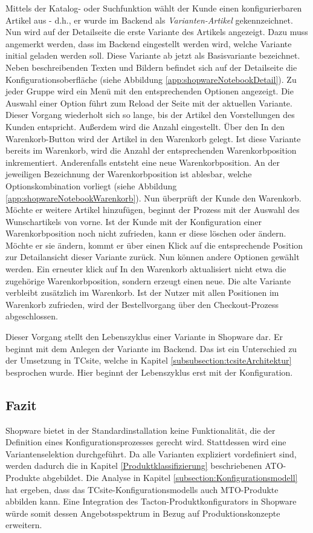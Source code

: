 \documentclass[11pt, a4paper, titlepage, listof=totoc, bibliography=totoc, index=totoc, twoside, openright, headings=normal]{scrreprt}
\begin{document}
Mittels der Katalog- oder Suchfunktion wählt der Kunde einen konfigurierbaren Artikel aus - d.h., er wurde im Backend als \emph{Varianten-Artikel} gekennzeichnet. Nun wird auf der Detailseite die erste Variante des Artikels angezeigt. Dazu muss angemerkt werden, dass im Backend eingestellt werden wird, welche Variante initial geladen werden soll. Diese Variante ab jetzt als Basisvariante bezeichnet. Neben beschreibenden Texten und Bildern befindet sich auf der Detailseite die Konfigurationsoberfläche (siehe Abbildung \ref{app:shopwareNotebookDetail}). Zu jeder Gruppe wird ein Menü mit den entsprechenden Optionen angezeigt. Die Auswahl einer Option führt zum Reload der Seite mit der aktuellen Variante. Dieser Vorgang wiederholt sich so lange, bis der Artikel den Vorstellungen des Kunden entspricht. Außerdem wird die Anzahl eingestellt. Über den \glqq In den Warenkorb\grqq{}-Button wird der Artikel in den Warenkorb gelegt. Ist diese Variante bereits im Warenkorb, wird die Anzahl der entsprechenden Warenkorbposition inkrementiert. Anderenfalls entsteht eine neue Warenkorbposition. An der jeweiligen Bezeichnung der Warenkorbposition ist ablesbar, welche Optionskombination vorliegt (siehe Abbildung \ref{app:shopwareNotebookWarenkorb}). Nun überprüft der Kunde den Warenkorb. Möchte er weitere Artikel hinzufügen, beginnt der Prozess mit der Auswahl des Wunschartikels von vorne. Ist der Kunde mit der Konfiguration einer Warenkorbposition noch nicht zufrieden, kann er diese löschen oder ändern. Möchte er sie ändern, kommt er über einen Klick auf die entsprechende Position zur Detailansicht dieser Variante zurück. Nun können andere Optionen gewählt werden. Ein erneuter klick auf \glqq In den Warenkorb\grqq{} aktualisiert nicht etwa die zugehörige Warenkorbposition, sondern erzeugt einen neue. Die alte Variante verbleibt zusätzlich im Warenkorb. Ist der Nutzer mit allen Positionen im Warenkorb zufrieden, wird der Bestellvorgang über den Checkout-Prozess abgeschlossen.

Dieser Vorgang stellt den Lebenszyklus einer Variante in Shopware dar. Er beginnt mit dem Anlegen der Variante im Backend. Das ist ein Unterschied zu der Umsetzung in TCsite, welche in Kapitel \ref{subsubsection:tcsiteArchitektur}
 besprochen wurde. Hier beginnt der Lebenszyklus erst mit der Konfiguration.

\subsection{Fazit}
Shopware bietet in der Standardinstallation keine Funktionalität, die der Definition eines Konfigurationsprozesses gerecht wird. Stattdessen wird eine Variantenselektion durchgeführt. Da alle Varianten expliziert vordefiniert sind, werden dadurch die in Kapitel \ref{Produktklassifizierung} beschriebenen \ac{ATO}-Produkte abgebildet. Die Analyse in Kapitel \ref{subsection:Konfigurationsmodell} hat ergeben, dass das TCsite-Konfigurationsmodells auch \ac{MTO}-Produkte abbilden kann. Eine Integration des Tacton-Produktkonfigurators in Shopware würde somit dessen Angebotsspektrum in Bezug auf Produktionskonzepte erweitern.
 
\end{document}
